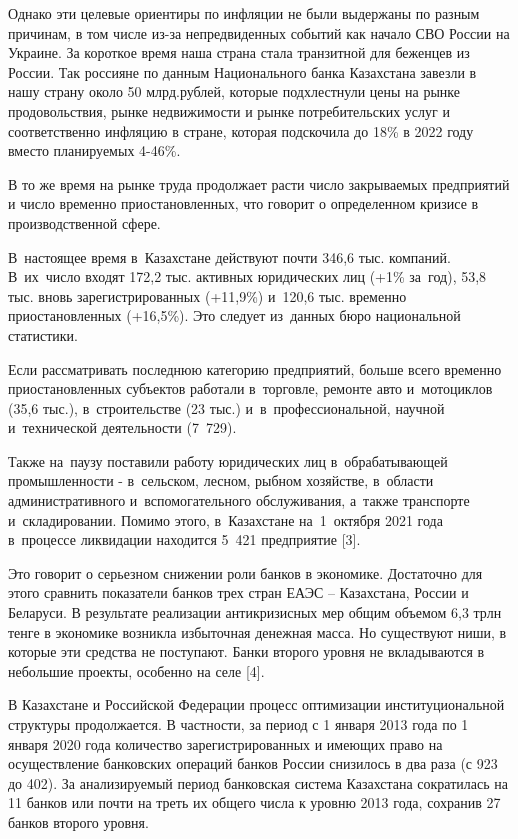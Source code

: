 \begin{multicols}{2}
Однако эти целевые ориентиры по инфляции не были выдержаны по разным
причинам, в том числе из-за непредвиденных событий как начало СВО России
на Украине. За короткое время наша страна стала транзитной для беженцев
из России. Так россияне по данным Национального банка Казахстана завезли
в нашу страну около 50 млрд.рублей, которые подхлестнули цены на рынке
продовольствия, рынке недвижимости и рынке потребительских услуг и
соответственно инфляцию в стране, которая подскочила до 18\% в 2022 году
вместо планируемых 4-46\%.

В то же время на рынке труда продолжает расти число закрываемых
предприятий и число временно приостановленных, что говорит о
определенном кризисе в производственной сфере.

В~настоящее время в~Казахстане действуют почти 346,6 тыс. компаний.
В~их~число входят 172,2 тыс. активных юридических лиц (+1\% за~год),
53,8 тыс. вновь зарегистрированных (+11,9\%) и~120,6 тыс. временно
приостановленных (+16,5\%). Это следует из~данных бюро национальной
статистики.

Если рассматривать последнюю категорию предприятий, больше всего
временно приостановленных субъектов работали в~торговле, ремонте авто
и~мотоциклов (35,6 тыс.), в~строительстве (23 тыс.)
и~в~профессиональной, научной и~технической деятельности (7~729).

Также на~паузу поставили работу юридических лиц в~обрабатывающей
промышленности - в~сельском, лесном, рыбном хозяйстве, в~области
административного и~вспомогательного обслуживания, а~также транспорте
и~складировании. Помимо этого, в~Казахстане на~1~октября 2021 года
в~процессе ликвидации находится 5~421 предприятие {[}3{]}.

Это говорит о серьезном снижении роли банков в экономике. Достаточно для
этого сравнить показатели банков трех стран ЕАЭС -- Казахстана, России и
Беларуси. В результате реализации антикризисных мер общим объемом 6,3
трлн тенге в экономике возникла избыточная денежная масса. Но существуют
ниши, в которые эти средства не поступают. Банки второго уровня не
вкладываются в небольшие проекты, особенно на селе {[}4{]}.

В Казахстане и Российской Федерации процесс оптимизации
институциональной структуры продолжается. В частности, за период с 1
января 2013 года по 1 января 2020 года количество зарегистрированных и
имеющих право на осуществление банковских операций банков России
снизилось в два раза (с 923 до 402). За анализируемый период банковская
система Казахстана сократилась на 11 банков или почти на треть их общего
числа к уровню 2013 года, сохранив 27 банков второго уровня.


\end{multicols}
